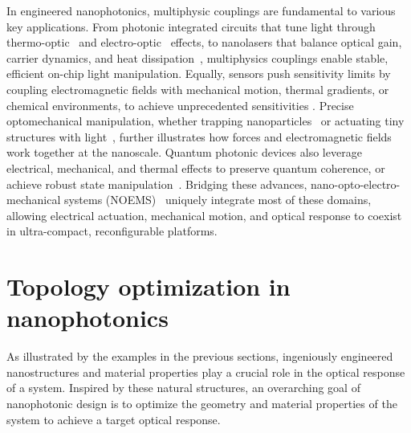 In engineered nanophotonics, multiphysic couplings are fundamental to various key applications. From photonic integrated circuits that tune light through  
thermo-optic~\cite{TOPS_1, TOPS_2, TOPS_3, program, PIC} and electro-optic~\cite{modu, modu1, modu2, pockels} effects, to nanolasers that balance optical gain, carrier dynamics, and heat dissipation~\cite{laser,laser_pic}, multiphysics couplings enable stable, efficient on-chip light manipulation. Equally, sensors  
push sensitivity limits by coupling electromagnetic fields with mechanical motion, thermal gradients, or chemical environments, to achieve unprecedented sensitivities \cite{therm_sensing,sensing, weakforce}.
Precise optomechanical manipulation, wheth\-er trapping nanoparticles~\cite{ashkin_acceleration_1970} or actuating tiny structures with light~\cite{ivanyi_optically_2024}, further illustrates how forces and electromagnetic fields work together at the nanoscale. Quantum photonic devices 
also leverage electrical, mechanical, and thermal effects to preserve quantum coherence, or achieve robust state manipulation~\cite{quant_eo, Andrews_2014, Xi_2025}. Bridging these advances, nano-opto-electro-mechanical systems (NOEMS)~\cite{NOEMS} uniquely integrate most of these  
domains, allowing electrical actuation, mechanical motion, and optical response to coexist in ultra-compact, reconfigurable platforms. 



\section{Topology optimization in nanophotonics}\label{intro:to}

As illustrated by the examples in the previous sections, ingeniously engineered nanostructures and material properties play a crucial role in the
optical response of a system. Inspired by these natural structures, an overarching goal of nanophotonic
design is to optimize the geometry and material properties of the system to achieve a target
optical response.

